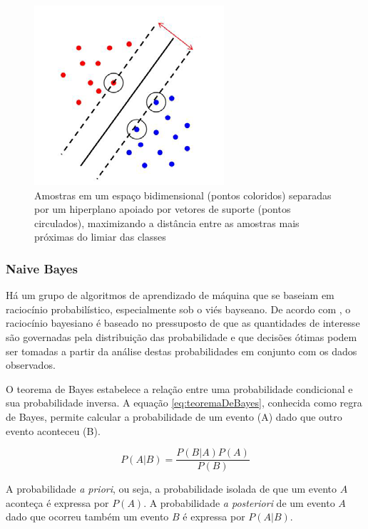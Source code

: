 \begin{figure}[h!]
  \centering
  \includegraphics[scale=0.5]{imgs/svm}
  \caption[Máquina de vetores de suporte]{Amostras em um espaço bidimensional (pontos coloridos) separadas por um hiperplano apoiado por vetores de suporte (pontos circulados), maximizando a distância entre as amostras mais próximas do limiar das classes}
  \label{fig:svm}
\end{figure}

\subsubsection*{Naive Bayes}

Há um grupo de algoritmos de aprendizado de máquina que se baseiam em raciocínio probabilístico, especialmente sob o viés bayseano. De acordo com , o raciocínio bayesiano é baseado no pressuposto de que as quantidades de interesse são governadas pela distribuição das probabilidade e que decisões ótimas podem ser tomadas a partir da análise destas probabilidades em conjunto com os dados observados.

O teorema de Bayes estabelece a relação entre uma probabilidade condicional e sua probabilidade inversa. A equação \ref{eq:teoremaDeBayes}, conhecida como regra de Bayes, permite calcular a probabilidade de um evento (A) dado que outro evento aconteceu (B).

\begin{equation}
	\displaystyle P(A|B) = \frac{P(B|A) P(A)}{P(B)}
\label{eq:teoremaDeBayes}
\end{equation}

A probabilidade \textit{a priori}, ou seja, a probabilidade isolada de que um evento $A$ aconteça é expressa por $P(A)$. A probabilidade \textit{a posteriori} de um evento $A$ dado que ocorreu também um evento $B$ é expressa por $P(A|B)$.

